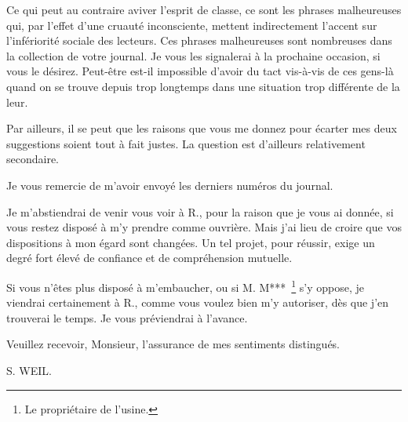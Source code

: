 \documentclass[french,twoside]{book} %
\begin{document}
Ce qui peut au contraire aviver l'esprit de classe, ce sont les phrases malheureuses qui, par l'effet d'une cruauté inconsciente, mettent indirectement l'accent sur l'infériorité sociale des lecteurs. Ces phrases malheureuses sont nombreuses dans la collection de votre journal. Je vous les signalerai à la prochaine occasion, si vous le désirez. Peut-être est-il impossible d'avoir du tact vis-à-vis de ces gens-là quand on se trouve depuis trop longtemps dans une situation trop différente de la leur.\par
Par ailleurs, il se peut que les raisons que vous me donnez pour écarter mes deux suggestions soient tout à fait justes. La question est d'ailleurs relativement secondaire.\par
\par
Je vous remercie de m'avoir envoyé les derniers numéros du journal.\par
Je m'abstiendrai de venir vous voir à R., pour la raison que je vous ai donnée, si vous restez disposé à m'y prendre comme ouvrière. Mais j'ai lieu de croire que vos dispositions à mon égard sont changées. Un tel projet, pour réussir, exige un degré fort élevé de confiance et de compréhension mutuelle.\par
Si vous n'êtes plus disposé à m'embaucher, ou si M. M*** \footnote{Le propriétaire de l'usine.} s'y oppose, je viendrai certainement à R., comme vous voulez bien m'y autoriser, dès que j'en trouverai le temps. Je vous préviendrai à l'avance.\par
Veuillez recevoir, Monsieur, l'assurance de mes sentiments distingués.\par
S. WEIL.\par
\end{document}
